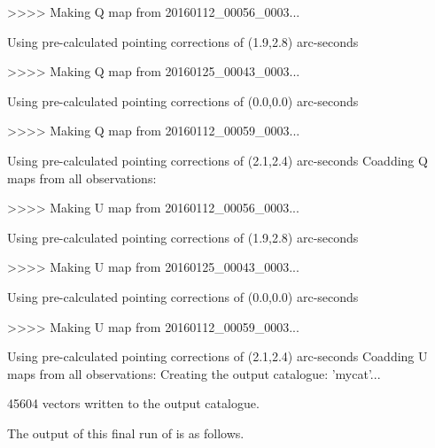 \begin{terminalv}
>>>>   Making Q map from 20160112_00056_0003...

   Using pre-calculated pointing corrections of (1.9,2.8) arc-seconds

>>>>   Making Q map from 20160125_00043_0003...

   Using pre-calculated pointing corrections of (0.0,0.0) arc-seconds

>>>>   Making Q map from 20160112_00059_0003...

   Using pre-calculated pointing corrections of (2.1,2.4) arc-seconds
Coadding Q maps from all observations:

>>>>   Making U map from 20160112_00056_0003...

   Using pre-calculated pointing corrections of (1.9,2.8) arc-seconds

>>>>   Making U map from 20160125_00043_0003...

   Using pre-calculated pointing corrections of (0.0,0.0) arc-seconds

>>>>   Making U map from 20160112_00059_0003...

   Using pre-calculated pointing corrections of (2.1,2.4) arc-seconds
Coadding U maps from all observations:
Creating the output catalogue: 'mycat'...

45604 vectors written to the output catalogue.
\end{terminalv}


The output of this final run of  is as follows.

